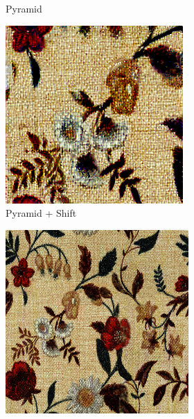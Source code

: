 \begin{figure}[ht]
\begin{subfigure}{0.8\textwidth}
\begin{subfigure}{0.32\textwidth}
            \caption{Pyramid}
            \label{fig:methods_comparison_small-pyramid}
        \end{subfigure}
        \hfill
        \begin{subfigure}{0.32\textwidth}
            \centering
            \includegraphics[width=\textwidth]{images/03-comparison_small_pyramid_shift.jpg}
            \caption{Pyramid + Shift}
            \label{fig:methods_comparison_small-pyramid_shift}
        \end{subfigure}
        \vskip 20pt
        \begin{subfigure}{0.32\textwidth}
            \centering
            \includegraphics[width=\textwidth]{images/03-comparison_large_target.jpg}

\end{subfigure}
\end{subfigure}
\end{figure}
